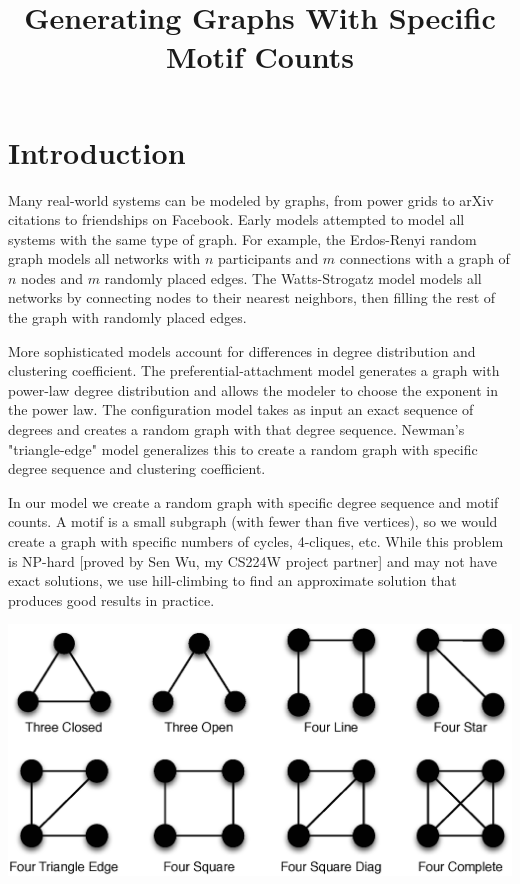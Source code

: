 \documentclass[12pt]{article}
\title{Generating Graphs With Specific Motif Counts}
\begin{document}
\maketitle

\section{Introduction}

Many real-world systems can be modeled by graphs, from power grids to arXiv citations to friendships on Facebook.  Early models attempted to model all systems with the same type of graph.  For example, the Erdos-Renyi random graph models all networks with $n$ participants and $m$ connections with a graph of $n$ nodes and $m$ randomly placed edges.  The Watts-Strogatz model models all networks by connecting nodes to their nearest neighbors, then filling the rest of the graph with randomly placed edges.

More sophisticated models account for differences in degree distribution and clustering coefficient.  The preferential-attachment model generates a graph with power-law degree distribution and allows the modeler to choose the exponent in the power law.  The configuration model takes as input an exact sequence of degrees and creates a random graph with that degree sequence.  Newman's "triangle-edge" model generalizes this to create a random graph with specific degree sequence and clustering coefficient.

In our model we create a random graph with specific degree sequence and motif counts.  A motif is a small subgraph (with fewer than five vertices), so we would create a graph with specific numbers of cycles, 4-cliques, etc.  While this problem is NP-hard [proved by Sen Wu, my CS224W project partner] and may not have exact solutions, we use hill-climbing to find an approximate solution that produces good results in practice.

\includegraphics[scale=0.50]{motifs.eps}\\
\end{document}
